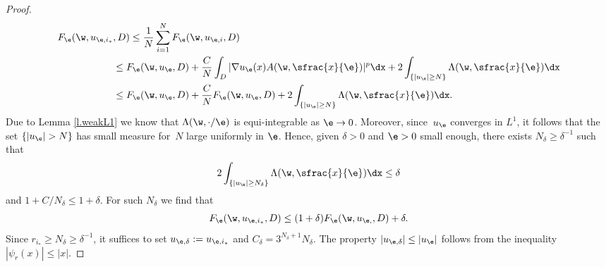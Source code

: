 \begin{proof}
\begin{align*}
F_{\e}(\w,u_{\e,i_*}&,D)\leq\frac{1}{N}\sum_{i=1}^N F_{\e}(\w,u_{\e,i},D)
\\
&\leq F_{\e}(\w,u_{\e},D)+\frac{C}{N}\int_{D}|\nabla u_{\e}(x)A(\w,\sfrac{x}{\e})|^p\dx+2\int_{\{|u_{\e}|\geq N\}}\Lambda(\w,\sfrac{x}{\e})\dx
\\
&\leq F_{\e}(\w,u_{\e},D)+\frac{C}{N}F_{\e}(\w,u_{\e},D)+2\int_{\{|u_{\e}|\geq N\}}\Lambda(\w,\sfrac{x}{\e})\dx.
\end{align*}
Due to Lemma \ref{l.weakL1} we know that $\Lambda(\w,\cdot/\e)$ is equi-integrable as $\e\to 0$. Moreover, since~$u_{\e}$ converges in $L^1$, it follows that the set $\{|u_{\e}|>N\}$ has small measure for~$N$ large uniformly in $\e$. Hence, given $\delta>0$ and $\e>0$ small enough, there exists $N_{\delta}\geq \delta^{-1}$ such that
\begin{equation*}
2\int_{\{|u_{\e}|\geq N_{\delta}\}}\Lambda(\w,\sfrac{x}{\e})\dx\leq \delta
\end{equation*}
and $1+C/N_{\delta}\leq 1+\delta$. For such $N_{\delta}$ we find that
\begin{equation*}
F_{\e}(\w,u_{\e,i_*},D)\leq (1+\delta)F_{\e}(\w,u_{\e,},D)+\delta.
\end{equation*}
Since $r_{i_*}\geq N_{\delta}\geq \delta^{-1}$, it suffices to set $u_{\e,\delta}:=u_{\e,i_*}$ and $C_{\delta}=3^{N_{\delta}+1}N_{\delta}$. The property $|u_{\e,\delta}|\leq |u_{\e}|$ follows from the inequality $|\psi_{r}(x)|\leq |x|$.
\end{proof}

